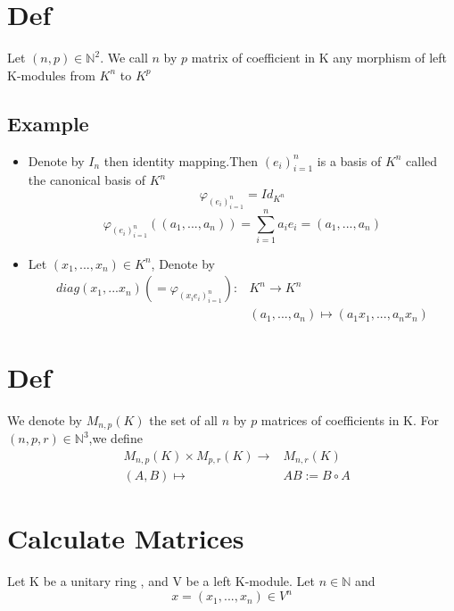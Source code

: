 \documentclass{book}
\begin{document}
\section{Def}
Let $(n,p)\in \mathbb{N}^2$. We call $n$ by $p$ matrix of coefficient in K any morphism of left K-modules from $K^n$ to $K^p$
\subsection{Example}
\begin{itemize}
    \item Denote by $I_n$ then identity mapping.Then $(e_i)_{i=1}^n$ is a basis of $K^n$ called the canonical basis of $K^n$
$$\varphi_{(e_i)_{i=1}^n}=Id_{K^n}$$$$\varphi _{(e_i)_{i=1}^n}((a_1,...,a_n))=\sum\limits_{i=1}^na_ie_i=(a_1,...,a_n)$$
    \item Let $(x_1,...,x_n)\in K^n$, Denote by $$\begin{aligned}
    diag(x_1,...x_n)(=\varphi_{(x_ie_i)_{i=1}^n}): &K^n\rightarrow K^n\\
    &(a_1,...,a_n)\mapsto (a_1x_1,...,a_nx_n)
\end{aligned}$$
\end{itemize}
\section{Def}
We denote by $M_{n,p}(K)$ the set of all $n$ by $p$ matrices of coefficients in K. For $(n,p,r)\in \mathbb{N}^3$,we define
$$\begin{aligned}
    &M_{n,p}(K)\times M_{p,r}(K)\rightarrow & M_{n,r}(K)\\
    &(A,B)\mapsto & AB:=B\circ A
\end{aligned}$$
\section{Calculate Matrices}
Let K be a unitary ring , and V be a left K-module.
Let $n\in \mathbb{N}$ and $$x=(x_1,...,x_n)\in V^n$$
\end{document}
